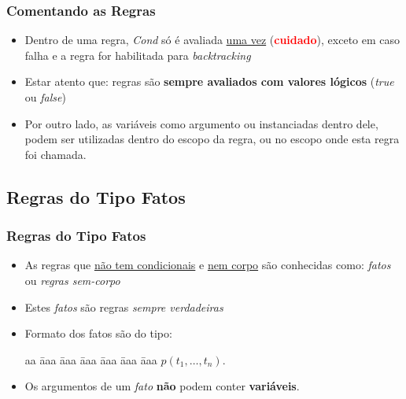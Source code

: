 \begin{frame} [fragile]
 	\frametitle{Comentando as Regras}
    \begin{itemize}
        
        \item Dentro de uma regra, \emph{Cond} só é avaliada \underline{uma vez} 
        (\textcolor{red}{\textbf{cuidado}}),
        exceto em caso falha e a regra for habilitada para \textit{backtracking}
                
        \pause
        \item Estar atento que: regras são \textbf{sempre avaliados com valores lógicos} ({\em true} ou {\em false})
        
        \pause
        \item Por outro lado, as variáveis  como argumento ou  instanciadas
        dentro dele, podem ser utilizadas dentro do escopo da regra, 
        ou no escopo onde  esta regra foi chamada.
    \end{itemize}
    
\end{frame}


\subsection{Regras do Tipo  Fatos}

\begin{frame} [fragile]
\frametitle{Regras do Tipo  Fatos}

    \begin{itemize}
        \item As regras que \underline{não tem condicionais} e \underline{nem corpo} são conhecidas
        como:  \textit{fatos} ou \textit{regras sem-corpo}
        
       \item Estes \textit{fatos} são regras \textit{sempre verdadeiras}
        
        \pause
        \item Formato dos fatos são do tipo:
        
        \begin{tabbing}
          aa \= aaa \= aaa \= aaa \= aaa \= aaa \= aaa \kill
          \> \> $p(t_1,\ldots,t_n)$. 
        \end{tabbing}
        
        \item Os argumentos de um \emph{fato} \textbf{não} podem conter \textbf{variáveis}.

    \end{itemize}
\end{frame}



